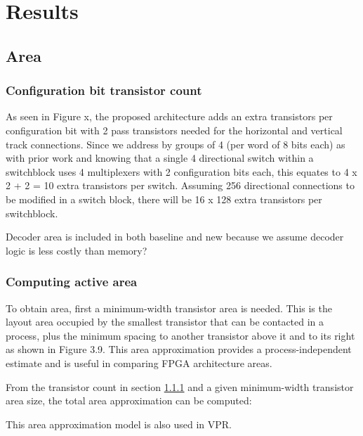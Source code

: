 
\chapter{Results}
\label{ch:Results}

\label{Circuits}

\section{Area}
\label{res:area}
\subsection{Configuration bit transistor count}
\label{arch:transcount}
As seen in Figure x, the proposed architecture adds an extra transistors per configuration bit with 2 pass transistors needed for the horizontal and vertical track connections. Since we address by groups of 4 (per word of 8 bits each) as with prior work and knowing that a single 4 directional switch within a switchblock uses 4 multiplexers with 2 configuration bits each, this equates to 4 x 2 + 2 = 10 extra transistors per switch. Assuming 256 directional connections to be modified in a switch block, there will be 16 x 128 extra transistors per switchblock.

Decoder area is included in both baseline and new because we assume decoder logic is less costly than memory?

\subsection{Computing active area}
To obtain area, first a minimum-width transistor area is needed. This is the layout area occupied by the smallest transistor that can be contacted in a process, plus the minimum spacing to another transistor above it and to its right as shown in Figure 3.9. This area approximation provides a process-independent estimate and is useful in comparing FPGA architecture areas.

From the transistor count in section \ref{arch:transcount} and a given minimum-width transistor area size, the total area approximation can be computed: 

This area approximation model is also used in VPR.


